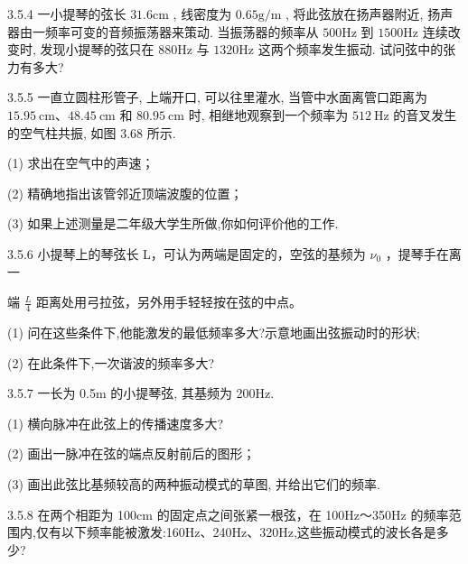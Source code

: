\begin{problem}{3.5.4}
一小提琴的弦长 $31.6\mathrm{cm}$ , 线密度为 $0.65\mathrm{g/m}$ , 将此弦放在扬声器附近, 扬声器由一频率可变的音频振荡器来策动. 当振荡器的频率从 $500\mathrm{Hz}$ 到 $1500\mathrm{Hz}$ 连续改变时, 发现小提琴的弦只在 $880\mathrm{Hz}$ 与 $1320\mathrm{Hz}$ 这两个频率发生振动. 试问弦中的张力有多大?
\end{problem}
\clearpage


\begin{problem}{3.5.5}
一直立圆柱形管子, 上端开口, 可以往里灌水, 当管中水面离管口距离为 $15.95 \mathrm{~cm} 、 48.45 \mathrm{~cm}$ 和 $80.95 \mathrm{~cm}$ 时, 相继地观察到一个频率为 $512 \mathrm{~Hz}$ 的音叉发生的空气柱共振, 如图 3.68 所示.

(1) 求出在空气中的声速；

(2) 精确地指出该管邻近顶端波腹的位置；

(3) 如果上述测量是二年级大学生所做,你如何评价他的工作.
\begin{center}

\end{center}
\end{problem}
\clearpage


\begin{problem}{3.5.6}
小提琴上的琴弦长 L，可认为两端是固定的，空弦的基频为 $\nu_{0}$ ，提琴手在离一

端 $\frac{L}{4}$ 距离处用弓拉弦，另外用手轻轻按在弦的中点。

(1) 问在这些条件下,他能激发的最低频率多大?示意地画出弦振动时的形状;

(2) 在此条件下,一次谐波的频率多大?
\begin{center}

\end{center}
\end{problem}
\clearpage


\begin{problem}{3.5.7}
一长为 0.5m 的小提琴弦, 其基频为 200Hz.

(1) 横向脉冲在此弦上的传播速度多大?

(2) 画出一脉冲在弦的端点反射前后的图形；

(3) 画出此弦比基频较高的两种振动模式的草图, 并给出它们的频率.
\end{problem}
\clearpage


\begin{problem}{3.5.8}
在两个相距为 100cm 的固定点之间张紧一根弦，在 100Hz～350Hz 的频率范围内,仅有以下频率能被激发:160Hz、240Hz、320Hz,这些振动模式的波长各是多少?
\begin{center}

\end{center}
\end{problem}
\clearpage



